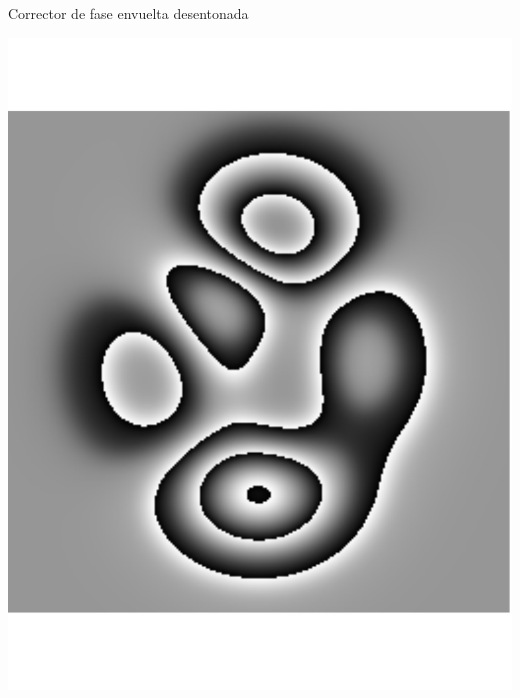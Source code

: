 \documentclass[]{beamer}
\begin{document}
\begin{frame}{Corrector de fase envuelta desentonada}
\begin{center}
\includegraphics[scale=0.2]{Images/wfaseIdeal_mejorada.pdf}

\end{center}
\end{frame}
\end{document}
